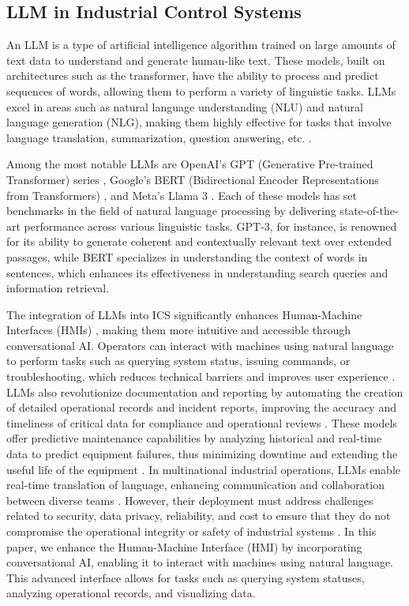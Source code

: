 \begin{bibunit}
\section{LLM in Industrial Control Systems}
\label{sec: LLM in ICS}

An LLM \cite{wang2024survey} is a type of artificial intelligence algorithm trained on large amounts of text data to understand and generate human-like text. These models, built on architectures such as the transformer, have the ability to process and predict sequences of words, allowing them to perform a variety of linguistic tasks. LLMs excel in areas such as natural language understanding (NLU) and natural language generation (NLG), making them highly effective for tasks that involve language translation, summarization, question answering, etc. \cite{wei2022emergent}. 

Among the most notable LLMs are OpenAI's GPT (Generative Pre-trained Transformer) series \cite{openai2023introducinggpts}, Google's BERT (Bidirectional Encoder Representations from Transformers) \cite{google2018bert}, and Meta's Llama 3 \cite{metallama3}. Each of these models has set benchmarks in the field of natural language processing by delivering state-of-the-art performance across various linguistic tasks. GPT-3, for instance, is renowned for its ability to generate coherent and contextually relevant text over extended passages, while BERT specializes in understanding the context of words in sentences, which enhances its effectiveness in understanding search queries and information retrieval.

The integration of LLMs into ICS significantly enhances Human-Machine Interfaces (HMIs) \cite{kiangala2024experimental}, making them more intuitive and accessible through conversational AI. Operators can interact with machines using natural language to perform tasks such as querying system status, issuing commands, or troubleshooting, which reduces technical barriers and improves user experience \cite{kernan2024knowledge}. LLMs also revolutionize documentation and reporting by automating the creation of detailed operational records and incident reports, improving the accuracy and timeliness of critical data for compliance and operational reviews \cite{hays2024employing}. These models offer predictive maintenance capabilities by analyzing historical and real-time data to predict equipment failures, thus minimizing downtime and extending the useful life of the equipment \cite{myohanen2023improving}. In multinational industrial operations, LLMs enable real-time translation of language, enhancing communication and collaboration between diverse teams \cite{mangaonkar2024enhancing}. However, their deployment must address challenges related to security, data privacy, reliability, and cost to ensure that they do not compromise the operational integrity or safety of industrial systems \cite{yao2024survey}. In this paper, we enhance the Human-Machine Interface (HMI) by incorporating conversational AI, enabling it to interact with machines using natural language. This advanced interface allows for tasks such as querying system statuses, analyzing operational records, and visualizing data. 


\end{bibunit}
